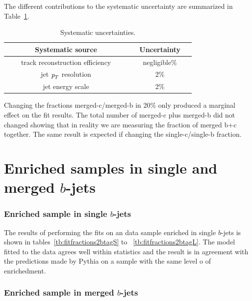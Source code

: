 \vspace{3mm}
The different contributions to the systematic uncertainty are summarized in Table~\ref{tb:systematicsfits}.
\begin{table}[!hbt] %
\renewcommand{\arraystretch}{1.2}
\centering
\begin{tabular}{ | c | c |}
\hline
  ~~~~~~~Systematic source~~~~~~~ &~~Uncertainty~~\\ \hline
  track reconstruction efficiency  &    negligible\%        \\ 
  jet ${\emph{p}_{T}}$ resolution  &    2\%        \\  
  jet energy scale  &    2\%        \\ \hline 
\end{tabular}
\caption{Systematic uncertainties.}
\label{tb:systematicsfits}
\end{table}



Changing the fractions merged-c/merged-b in 20\% only produced a marginal effect on the fit results. The total number of merged-c plus merged-b did not changed showing that in reality we are measuring the fraction of merged b+c together. The same result is expected if changing the single-c/single-b fraction.


\section{Enriched samples in single and merged $b$-jets}\label{sec:Enriched}


\subsubsection{Enriched sample in single $b$-jets}

The results of performing the fits on an data sample enriched in single $b$-jets is shown in tables~\ref{tb:fitfractions2btagS} to ~\ref{tb:fitfractions2btagL}. The model fitted to the data agrees well within statistics %
and the result is in agreement with the predictions made by {\sc Pythia} on a sample with the same level o of enrichedment.  %


\subsubsection{Enriched sample in merged $b$-jets}







